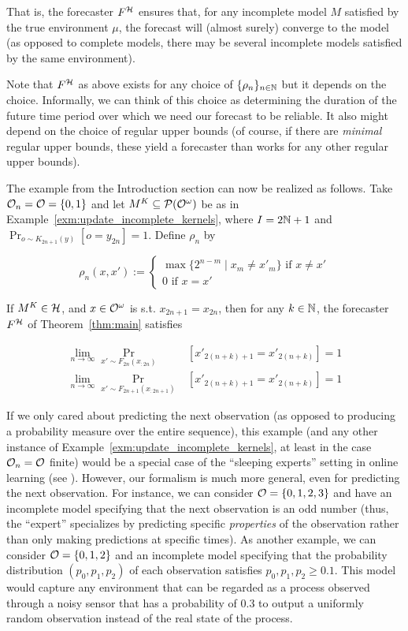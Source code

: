 That is, the forecaster $F^{\mathcal{H}}$ ensures that, for any incomplete model $M$ satisfied by the true environment $\mu$, the forecast will (almost surely) converge to the model (as opposed to complete models, there may be several incomplete models satisfied by the same environment).

Note that $F^{\mathcal{H}}$ as above exists for any choice of $\{\rho_n\}_{n \in \mathbb{N}}$ but it depends on the choice. Informally, we can think of this choice as determining the duration of the future time period over which we need our forecast to be reliable. It also might depend on the choice of regular upper bounds (of course, if there are \emph{minimal} regular upper bounds, these yield a forecaster than works for any other regular upper bounds).

The example from the Introduction section can now be realized as follows. Take $\mathcal{O}_n=\mathcal{O}=\{0,1\}$ and let $M^K \subseteq \mathcal{P}(\mathcal{O}^\omega)$ be as in Example~\ref{exm:update_incomplete_kernels}, where $I = 2\mathbb{N}+1$ and $\Pr_{o\sim K_{2n+1}(y)}\left[o=y_{2n}\right]=1$. Define $\rho_n$  by

\begin{equation}
\rho_n(x,x'):=\begin{cases} \max\{2^{n-m} \mid x_{m} \ne x'_{m}\} \text{ if } x \ne x' \\ 0 \text{ if } x=x'\end{cases}
\end{equation}

If $M^K \in \mathcal{H}$, and $x\in\mathcal{O}^\omega$ is s.t. $x_{2n+1}=x_{2n}$, then for any $k \in \mathbb{N}$, the forecaster $F^{\mathcal{H}}$ of Theorem~\ref{thm:main} satisfies

\begin{align}
\lim_{n\rightarrow\infty} \Pr_{x' \sim F_{2n}\left(x_{:2n}\right)}&\left[x'_{2(n+k)+1}=x'_{2(n+k)}\right] = 1\\
\lim_{n\rightarrow\infty} \Pr_{x' \sim F_{2n+1}\left(x_{:2n+1}\right)}&\left[x'_{2(n+k)+1}=x'_{2(n+k)}\right] = 1
\end{align}

If we only cared about predicting the next observation (as opposed to producing a probability measure over the entire sequence), this example (and any other instance of Example~\ref{exm:update_incomplete_kernels}, at least in the case $\mathcal{O}_n=\mathcal{O}$ finite) would be a special case of the \enquote{sleeping experts} setting in online learning (see \cite{Freund_1997}). However, our formalism is much more general, even for predicting the next observation. For instance, we can consider $\mathcal{O}=\{0,1,2,3\}$ and have an incomplete model specifying that the next observation is an odd number (thus, the \enquote{expert} specializes by predicting specific \emph{properties} of the observation rather than only making predictions at specific times). As another example, we can consider $\mathcal{O}=\{0,1,2\}$ and an incomplete model specifying that the probability distribution $\left(p_0,p_1,p_2\right)$ of each observation satisfies $p_0,p_1,p_2 \geq 0.1$. This model would capture any environment that can be regarded as a process observed through a noisy sensor that has a probability of 0.3 to output a uniformly random observation instead of the real state of the process.

